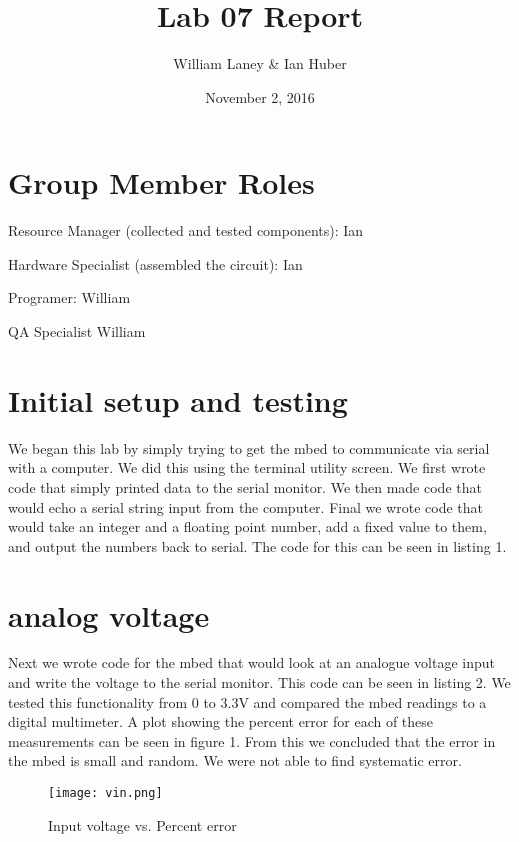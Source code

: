 \documentclass[prl,12pt,notitlepage,aps,onecolumn,superscriptaddress]{revtex4-1}
\begin{document}
\title{Lab 07 Report}
\author{William Laney \& Ian Huber}
\date{November 2, 2016}
\maketitle


\section{Group Member Roles}
Resource Manager (collected and tested components): Ian


Hardware Specialist (assembled the circuit): Ian


Programer: William


QA Specialist William


\section{Initial setup and testing}
We began this lab by simply trying to get the mbed to communicate via serial with a computer. We did this using the terminal utility screen. We first wrote code that simply printed data to the serial monitor. We then made code that would echo a serial string input from the computer. Final we wrote code that would take an integer and a floating point number, add a fixed value to them, and output the numbers back to serial. The code for this can be seen in listing 1.


\section{analog voltage}
Next we wrote code for the mbed that would look at an analogue voltage input and write the voltage to the serial monitor. This code can be seen in listing 2. We tested this functionality from 0 to 3.3V and compared the mbed readings to a digital multimeter. A plot showing the percent error for each of these measurements can be seen in figure 1. From this we concluded that the error in the mbed is small and random. We were not able to find systematic error.


\begin{figure}[h]
\begin{center}
\texttt{[image: vin.png]}
\end{center}
\caption{\label{fig:pic} Input voltage vs. Percent error}
\end{figure}
\end{document}
